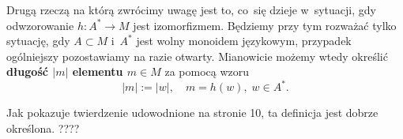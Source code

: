 \documentclass[a4paper,11pt]{article}
\begin{document}
Drugą rzeczą na którą zwrócimy uwagę jest to, co~się dzieje w~sytuacji, gdy
odwzorowanie $h : A^{ * } \to M$ jest izomorfizmem. Będziemy przy tym rozważać
tylko sytuację, gdy $A \subset M$ i~$A^{ * }$ jest wolny monoidem językowym,
przypadek ogólniejszy pozostawiamy na razie otwarty. Mianowicie możemy wtedy
określić \textbf{długość $| m |$ elementu $m \in M$} za pomocą wzoru
\begin{equation}
  \label{eq:Forys-Forys-16}
  | m | := | w |, \quad
  m = h( w ),\; w \in A^{ * }.
\end{equation}

Jak pokazuje twierdzenie udowodnione na stronie 10, ta definicja jest dobrze
określona. ????

\vspace{\spaceFour}





\end{document}
